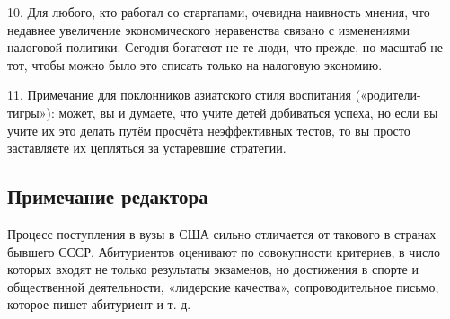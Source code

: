 \documentclass[ebook,12pt,oneside,openany]{memoir}
\begin{document}
10. Для любого, кто работал со стартапами, очевидна наивность мнения,
что недавнее увеличение экономического неравенства связано с
изменениями налоговой политики. Сегодня богатеют не те люди, что
прежде, но масштаб не тот, чтобы можно было это списать только на
налоговую экономию.

11. Примечание для поклонников азиатского стиля воспитания
(«родители-тигры»): может, вы и думаете, что учите детей добиваться
успеха, но если вы учите их это делать путём просчёта неэффективных
тестов, то вы просто заставляете их цепляться за устаревшие стратегии.

\subsection{Примечание редактора}
Процесс поступления в вузы в США сильно
отличается от такового в странах бывшего СССР. Абитуриентов оценивают
по совокупности критериев, в число которых входят не только результаты
экзаменов, но достижения в спорте и общественной деятельности,
«лидерские качества», сопроводительное письмо, которое пишет
абитуриент и т. д.
\end{document}
